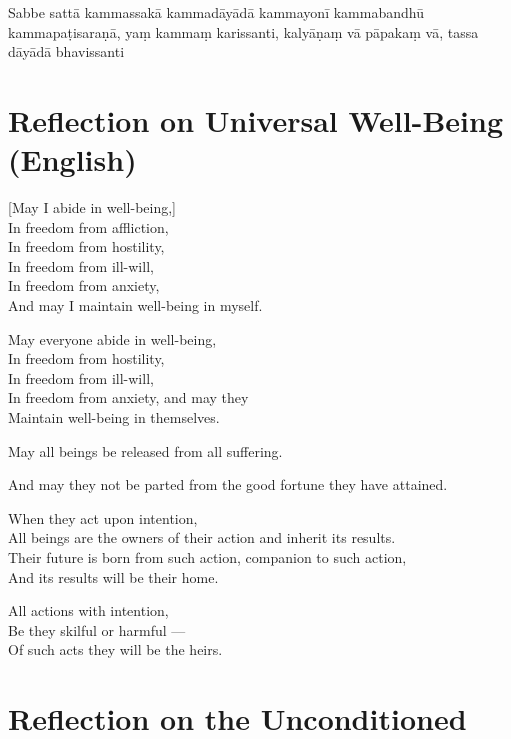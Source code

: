 Sabbe sattā kammassakā kammadāyādā kammayonī kammabandhū kammapaṭisaraṇā,
yaṃ kammaṃ karissanti, kalyāṇaṃ vā pāpakaṃ vā, tassa dāyādā bhavissanti


\section{Reflection on Universal Well-Being (English)}

\begin{leader}
\end{leader}


[May I abide in well-being,]\\
In freedom from affliction,\\
In freedom from hostility,\\
In freedom from ill-will,\\
In freedom from anxiety,\\
And may I maintain well-being in myself.

May everyone abide in well-being,\\
In freedom from hostility,\\
In freedom from ill-will,\\
In freedom from anxiety, and may they\\
Maintain well-being in themselves.

May all beings be released from all suffering.

And may they not be parted from the good fortune they have attained.

When they act upon intention,\\
All beings are the owners of their action and inherit its results.\\
Their future is born from such action, companion to such action,\\
And its results will be their home.

All actions with intention,\\
Be they skilful or harmful ---\\
Of such acts they will be the heirs.


\section[The Unconditioned]{Reflection on the Unconditioned}

